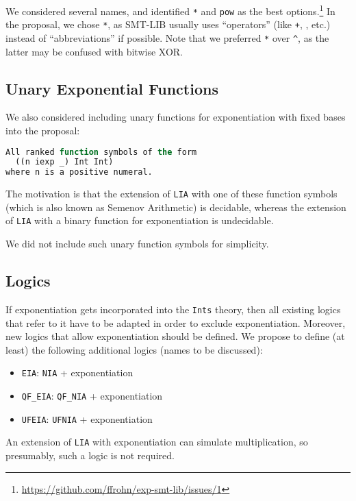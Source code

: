 \documentclass{article}
\begin{document}
We considered several names, and identified {\tt **} and {\tt pow} as the best options.\footnote{\url{https://github.com/ffrohn/exp-smt-lib/issues/1}}
%
In the proposal, we chose {\tt **}, as SMT-LIB usually uses ``operators'' (like {\tt +}, {\tt *}, etc.) instead of ``abbreviations'' if possible.
%
Note that we preferred {\tt **} over {\tt \^{}}, as the latter may be confused with bitwise XOR.

\subsection{Unary Exponential Functions}

We also considered including unary functions for exponentiation with fixed bases into the proposal:
%
\begin{lstlisting}[language=Lisp]
All ranked function symbols of the form
  ((n iexp _) Int Int)
where n is a positive numeral.
\end{lstlisting}
%
The motivation is that the extension of {\tt LIA} with one of these function symbols (which is also known as Semenov Arithmetic) is decidable, whereas the extension of {\tt LIA} with a binary function for exponentiation is undecidable.

We did not include such unary function symbols for simplicity.

\subsection{Logics}

If exponentiation gets incorporated into the {\tt Ints} theory, then all existing logics that refer to it have to be adapted in order to exclude exponentiation.
%
Moreover, new logics that allow exponentiation should be defined.
%
We propose to define (at least) the following additional logics (names to be discussed):
%
\begin{itemize}
\item {\tt EIA}: {\tt NIA} + exponentiation
\item {\tt QF\_EIA}: {\tt QF\_NIA} + exponentiation
\item {\tt UFEIA}: {\tt UFNIA} + exponentiation
\end{itemize}
%
An extension of {\tt LIA} with exponentiation can simulate multiplication, so presumably, such a logic is not required.


\end{document}
